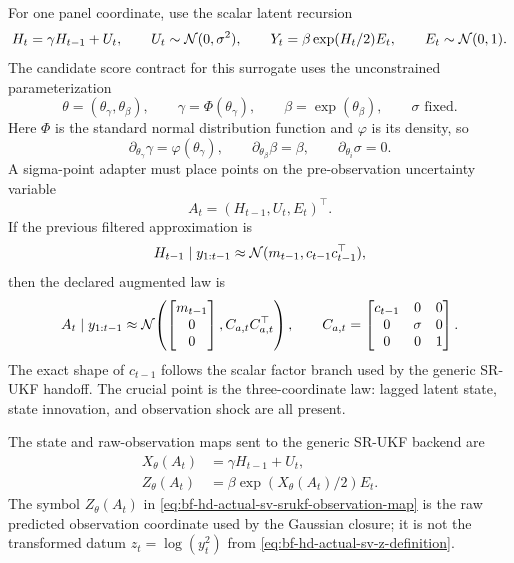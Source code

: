 For one panel coordinate, use the scalar latent recursion
\begin{equation}
  H_t=\gamma H_{t-1}+U_t,
  \qquad
  U_t\sim\mathcal{N}(0,\sigma^2),
  \qquad
  Y_t=\beta \exp(H_t/2)E_t,
  \qquad
  E_t\sim\mathcal{N}(0,1).
  \label{eq:bf-hd-actual-sv-srukf-model}
\end{equation}
The candidate score contract for this surrogate uses the unconstrained
parameterization
\begin{equation}
  \theta=(\theta_\gamma,\theta_\beta),
  \qquad
  \gamma=\Phi(\theta_\gamma),
  \qquad
  \beta=\exp(\theta_\beta),
  \qquad
  \sigma \text{ fixed}.
  \label{eq:bf-hd-actual-sv-srukf-parameterization}
\end{equation}
Here \(\Phi\) is the standard normal distribution function and
\(\varphi\) is its density, so
\begin{equation}
  \partial_{\theta_\gamma}\gamma=\varphi(\theta_\gamma),
  \qquad
  \partial_{\theta_\beta}\beta=\beta,
  \qquad
  \partial_{\theta_i}\sigma=0.
  \label{eq:bf-hd-actual-sv-srukf-parameter-derivatives}
\end{equation}
A sigma-point adapter must place points on the pre-observation uncertainty
variable
\begin{equation}
  A_t=(H_{t-1},U_t,E_t)^\top .
  \label{eq:bf-hd-actual-sv-srukf-augmented-variable}
\end{equation}
If the previous filtered approximation is
\[
  H_{t-1}\mid y_{1:t-1}\approx
  \mathcal{N}(m_{t-1},c_{t-1}c_{t-1}^\top),
\]
then the declared augmented law is
\begin{equation}
  A_t\mid y_{1:t-1}
  \approx
  \mathcal{N}\!\left(
    \begin{bmatrix}m_{t-1}\\0\\0\end{bmatrix},
    C_{a,t}C_{a,t}^\top
  \right),
  \qquad
  C_{a,t}
  =
  \begin{bmatrix}
    c_{t-1} & 0 & 0\\
    0 & \sigma & 0\\
    0 & 0 & 1
  \end{bmatrix}.
  \label{eq:bf-hd-actual-sv-srukf-augmented-law}
\end{equation}
The exact shape of \(c_{t-1}\) follows the scalar factor branch used by the
generic SR-UKF handoff.  The crucial point is the three-coordinate law:
lagged latent state, state innovation, and observation shock are all present.

The state and raw-observation maps sent to the generic SR-UKF backend are
\begin{align}
  X_\theta(A_t)
    &=
    \gamma H_{t-1}+U_t,
    \label{eq:bf-hd-actual-sv-srukf-transition-map}\\
  Z_\theta(A_t)
    &=
    \beta\exp(X_\theta(A_t)/2)E_t .
    \label{eq:bf-hd-actual-sv-srukf-observation-map}
\end{align}
The symbol \(Z_\theta(A_t)\) in
\eqref{eq:bf-hd-actual-sv-srukf-observation-map} is the raw predicted
observation coordinate used by the Gaussian closure; it is not the transformed
datum \(z_t=\log(y_t^2)\) from
\eqref{eq:bf-hd-actual-sv-z-definition}.

